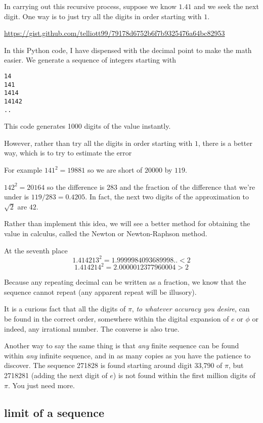 \documentclass[11pt, oneside]{article}
\begin{document}
In carrying out this recursive process, suppose we know $1.41$ and we seek the next digit.  One way is to just try all the digits in order starting with $1$.

\url{https://gist.github.com/telliott99/79178d6752b6f7b9325476a64bc82953}

In this Python code, I have dispensed with the decimal point to make the math easier.  We generate a sequence of integers starting with 

\begin{verbatim}
14
141
1414
14142
..
\end{verbatim}

This code generates 1000 digits of the value instantly.

However, rather than try all the digits in order starting with $1$, there is a better way, which is to try to estimate the error

For example $141^2 = 19881$ so we are short of $20000$ by $119$.  

$142^2 = 20164$ so the difference is $283$ and the fraction of the difference that we're under is $119/283 = 0.4205$.  In fact, the next two digits of the approximation to $\sqrt{2}$ are $42$.

Rather than implement this idea, we will see a better method for obtaining the value in calculus, called the Newton or Newton-Raphson method.

At the seventh place
\[ 1.414213^2 = 1.9999984093689998.. < 2 \]
\[ 1.414214^2 = 2.0000012377960004 > 2 \]

Because any repeating decimal can be written as a fraction, we know that the sequence cannot repeat (any apparent repeat will be illusory).  

It is a curious fact that all the digits of $\pi$, \emph{to whatever accuracy you desire}, can be found in the correct order, somewhere within the digital expansion of $e$ or $\phi$ or indeed, any irrational number.  The converse is also true.

Another way to say the same thing is that \emph{any} finite sequence can be found within \emph{any} infinite sequence, and in as many copies as you have the patience to discover.  The sequence 271828 is found starting around digit 33,790 of $\pi$, but 2718281 (adding the next digit of $e$) is not found within the first million digits of $\pi$.  You just need more.

\subsection*{limit of a sequence}
\end{document}
